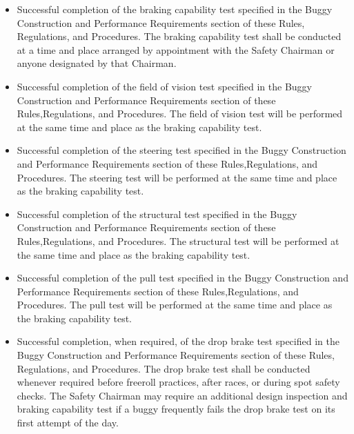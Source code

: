 	\begin{itemize}

		\item
		Successful completion of the braking capability test specified in the Buggy Construction and Performance Requirements section of these Rules, Regulations, and Procedures. The braking capability test shall be conducted at a time and place arranged by appointment with the Safety Chairman or anyone designated by that Chairman.

		\item
		Successful completion of the field of vision test specified in the Buggy Construction and Performance Requirements section of these Rules,Regulations, and Procedures. The field of vision test will be performed at the same time and place as the braking capability test.

		\item
		Successful completion of the steering test specified in the Buggy Construction and Performance Requirements section of these Rules,Regulations, and Procedures. The steering test will be performed at the same time and place as the braking capability test. 

		\item
		Successful completion of the structural test specified in the Buggy Construction and Performance Requirements section of these Rules,Regulations, and Procedures. The structural test will be performed at the same time and place as the braking capability test. 

		\item
		Successful completion of the pull test specified in the Buggy Construction and Performance Requirements section of these Rules,Regulations, and Procedures. The pull test will be performed at the same time and place as the braking capability test. 

		\item
		Successful completion, when required, of the drop brake test specified in the Buggy Construction and Performance Requirements section of these Rules, Regulations, and Procedures. The drop brake test shall be conducted whenever required before freeroll practices, after races, or during spot safety checks. The Safety Chairman may require an additional design inspection and braking capability test if a buggy frequently fails the drop brake test on its first attempt of the day.


\end{itemize}
